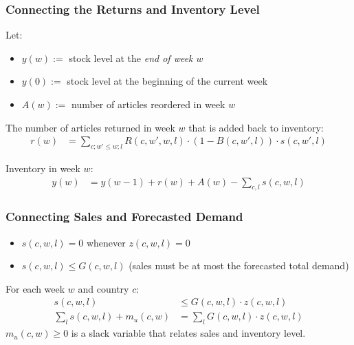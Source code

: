 \documentclass[xcolor=table]{beamer}
\begin{document}
\begin{frame}[t]
\frametitle{Connecting the Returns and Inventory Level}
  Let:
  \begin{itemize}
    \item $y(w) :=$ stock level at the \emph{end of week $w$} 
    \item $y(0) :=$ stock level at the beginning of the current week
    \item $A(w) := $ number of articles reordered in week $w$
  \end{itemize}

\bigskip

\pause

The number of articles returned in week $w$ that is added back to inventory:
\begin{align*}
  r(w) & = \sum_{c; w' \leq w; l} R(c, w', w, l) \cdot (1 - B(c, w', l)) \cdot
  s(c, w', l)
\end{align*}

Inventory in week $w$:
\begin{align*}
    y(w) & = y(w - 1) + r(w) + A(w) - \sum_{c, l} s(c, w, l)
\end{align*}
\end{frame}

\begin{frame}[t]
\frametitle{Connecting Sales and Forecasted Demand}
  \begin{itemize}
    \item $s(c, w, l) = 0$ whenever $z(c, w, l) = 0$
    \item $s(c, w, l) \leq G(c, w, l)$ (sales must be at most the forecasted total demand)
    \end{itemize}

  For each week $w$ and country $c$:
    \begin{align*}
     s(c, w, l) & \leq G(c, w, l) \cdot z(c, w, l) \\
      \sum_{l} s(c, w, l) + m_u(c, w) & = \sum_{l} G(c, w, l) \cdot z(c, w, l)
    \end{align*}
  $m_u(c, w) \geq 0$ is a slack variable that relates sales and inventory
  level.
\end{frame}
\end{document}
